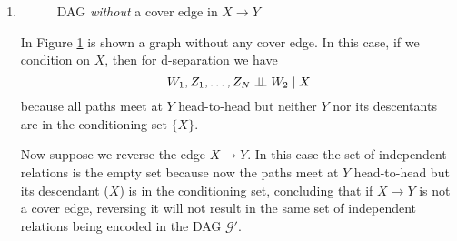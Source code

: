 \documentclass{amsmlaj}
\begin{document}
\begin{sol}
\begin{enumerate}
		\item
			\begin{figure}[H]
				\centering
				\caption{DAG \emph{without} a cover edge in $X \rightarrow Y$}
				\label{fig:cover-counter}
			\end{figure}
			In Figure \ref{fig:cover-counter} is shown a graph without any cover edge.
			In this case, if we condition on $X$, then for d-separation we have
			\begin{equation}
				W_1,Z_1,\dots,Z_N \perp\!\!\!\perp W_2 \mid X
			\end{equation}
			because all paths meet at $Y$ head-to-head but neither $Y$ nor its
			descentants are in the conditioning set $\{X\}$.

			Now suppose we reverse the edge $X \rightarrow Y$. In this case the set of
			independent relations is the empty set because now the paths meet at $Y$
			head-to-head but its descendant ($X$) is in the conditioning set,
			concluding that if $X \rightarrow Y$ is not a cover edge, reversing it
			will not result in the same set of independent relations being encoded in
			the DAG $\mathcal{G}'$.
	\end{enumerate}
\end{sol}
\end{document}
